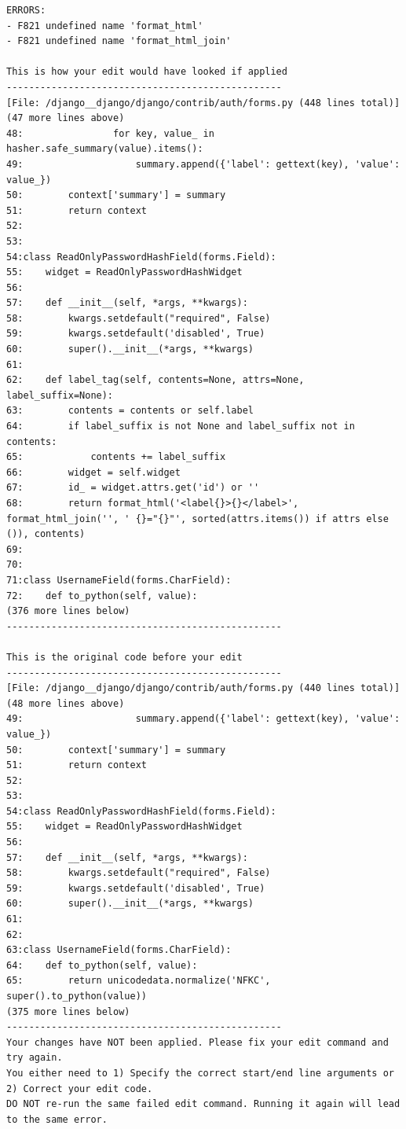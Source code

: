 {\begin{observationbox}
\begin{Verbatim}[breaklines=true, breakanywhere=true]
ERRORS:
- F821 undefined name 'format_html'
- F821 undefined name 'format_html_join'

This is how your edit would have looked if applied
-------------------------------------------------
[File: /django__django/django/contrib/auth/forms.py (448 lines total)]
(47 more lines above)
48:                for key, value_ in hasher.safe_summary(value).items():
49:                    summary.append({'label': gettext(key), 'value': value_})
50:        context['summary'] = summary
51:        return context
52:
53:
54:class ReadOnlyPasswordHashField(forms.Field):
55:    widget = ReadOnlyPasswordHashWidget
56:
57:    def __init__(self, *args, **kwargs):
58:        kwargs.setdefault("required", False)
59:        kwargs.setdefault('disabled', True)
60:        super().__init__(*args, **kwargs)
61:
62:    def label_tag(self, contents=None, attrs=None, label_suffix=None):
63:        contents = contents or self.label
64:        if label_suffix is not None and label_suffix not in contents:
65:            contents += label_suffix
66:        widget = self.widget
67:        id_ = widget.attrs.get('id') or ''
68:        return format_html('<label{}>{}</label>', format_html_join('', ' {}="{}"', sorted(attrs.items()) if attrs else ()), contents)
69:
70:
71:class UsernameField(forms.CharField):
72:    def to_python(self, value):
(376 more lines below)
-------------------------------------------------

This is the original code before your edit
-------------------------------------------------
[File: /django__django/django/contrib/auth/forms.py (440 lines total)]
(48 more lines above)
49:                    summary.append({'label': gettext(key), 'value': value_})
50:        context['summary'] = summary
51:        return context
52:
53:
54:class ReadOnlyPasswordHashField(forms.Field):
55:    widget = ReadOnlyPasswordHashWidget
56:
57:    def __init__(self, *args, **kwargs):
58:        kwargs.setdefault("required", False)
59:        kwargs.setdefault('disabled', True)
60:        super().__init__(*args, **kwargs)
61:
62:
63:class UsernameField(forms.CharField):
64:    def to_python(self, value):
65:        return unicodedata.normalize('NFKC', super().to_python(value))
(375 more lines below)
-------------------------------------------------
Your changes have NOT been applied. Please fix your edit command and try again.
You either need to 1) Specify the correct start/end line arguments or 2) Correct your edit code.
DO NOT re-run the same failed edit command. Running it again will lead to the same error.


\end{Verbatim}
\end{observationbox}}
